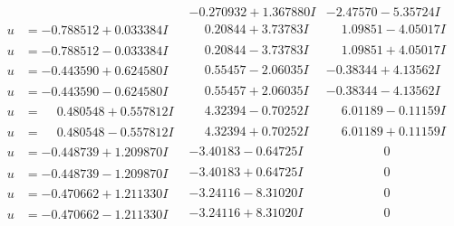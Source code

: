 \documentclass[1p]{elsarticle_modified}
\theoremstyle{definition}
\begin{document}
$$\begin{array}{c|c|c}
 & -0.270932 + 1.367880 I & -2.47570 - 5.35724 I \\ \hline\begin{aligned}
u &= -0.788512 + 0.033384 I\end{aligned}
 & \phantom{-}0.20844 + 3.73783 I & \phantom{-}1.09851 - 4.05017 I \\ \hline\begin{aligned}
u &= -0.788512 - 0.033384 I\end{aligned}
 & \phantom{-}0.20844 - 3.73783 I & \phantom{-}1.09851 + 4.05017 I \\ \hline\begin{aligned}
u &= -0.443590 + 0.624580 I\end{aligned}
 & \phantom{-}0.55457 - 2.06035 I & -0.38344 + 4.13562 I \\ \hline\begin{aligned}
u &= -0.443590 - 0.624580 I\end{aligned}
 & \phantom{-}0.55457 + 2.06035 I & -0.38344 - 4.13562 I \\ \hline\begin{aligned}
u &= \phantom{-}0.480548 + 0.557812 I\end{aligned}
 & \phantom{-}4.32394 - 0.70252 I & \phantom{-}6.01189 - 0.11159 I \\ \hline\begin{aligned}
u &= \phantom{-}0.480548 - 0.557812 I\end{aligned}
 & \phantom{-}4.32394 + 0.70252 I & \phantom{-}6.01189 + 0.11159 I \\ \hline\begin{aligned}
u &= -0.448739 + 1.209870 I\end{aligned}
 & -3.40183 - 0.64725 I & \phantom{-0.000000 } 0 \\ \hline\begin{aligned}
u &= -0.448739 - 1.209870 I\end{aligned}
 & -3.40183 + 0.64725 I & \phantom{-0.000000 } 0 \\ \hline\begin{aligned}
u &= -0.470662 + 1.211330 I\end{aligned}
 & -3.24116 - 8.31020 I & \phantom{-0.000000 } 0 \\ \hline\begin{aligned}
u &= -0.470662 - 1.211330 I\end{aligned}
 & -3.24116 + 8.31020 I & \phantom{-0.000000 } 0 \\ \hline\begin{aligned}

\end{aligned}
\end{array}$$
\end{document}

